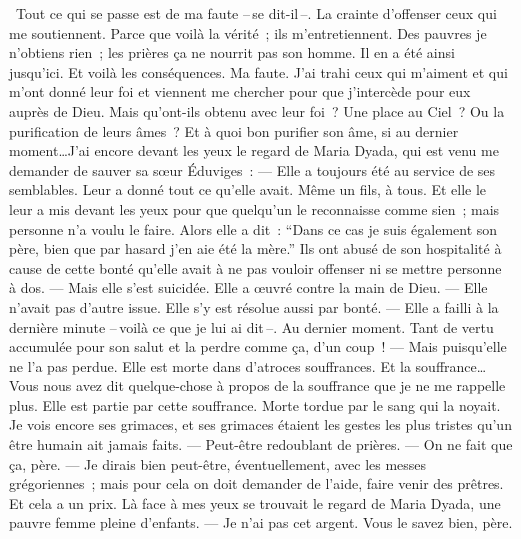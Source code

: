 \begin{pages}
\begin{Rightside}
			\og{} Tout ce qui se passe est de ma faute --\,se dit-il\,--. La crainte d’offenser ceux qui me soutiennent. Parce que voilà la vérité ; ils m’entretiennent. Des pauvres je n’obtiens rien ; les prières ça ne nourrit pas son homme. Il en a été ainsi jusqu’ici. Et voilà les conséquences. Ma faute. J’ai trahi ceux qui m’aiment et qui m’ont donné leur foi et viennent me chercher pour que j’intercède pour eux auprès de Dieu. Mais qu’ont-ils obtenu avec leur foi ? Une place au Ciel ? Ou la purification de leurs âmes ? Et à quoi bon purifier son âme, si au dernier moment\ldots J’ai encore devant les yeux le regard de Maria Dyada, qui est venu me demander de sauver sa sœur Éduviges :
		\pend
		\pstart
			\guillemotright --- Elle a toujours été au service de ses semblables. Leur a donné tout ce qu’elle avait. Même un fils, à tous. Et elle le leur a mis devant les yeux pour que quelqu’un le reconnaisse comme sien ; mais personne n’a voulu le faire. Alors elle a dit : ``Dans ce cas je suis également son père, bien que par hasard j’en aie été la mère.'' Ils ont abusé de son hospitalité à cause de cette bonté qu’elle avait à ne pas vouloir offenser ni se mettre personne à dos.
		\pend
		\pstart
			\guillemotright --- Mais elle s’est suicidée. Elle a œuvré contre la main de Dieu.
		\pend
		\pstart
			\guillemotright --- Elle n’avait pas d’autre issue. Elle s’y est résolue aussi par bonté.
		\pend
		\pstart
			\guillemotright --- Elle a failli à la dernière minute --\,voilà ce que je lui ai dit\,--. Au dernier moment. Tant de vertu accumulée pour son salut et la perdre comme ça, d'un coup !
		\pend
		\pstart
			\guillemotright --- Mais puisqu’elle ne l’a pas perdue. Elle est morte dans d’atroces souffrances. Et la souffrance… Vous nous avez dit quelque-chose à propos de la souffrance que je ne me rappelle plus. Elle est partie par cette souffrance. Morte tordue par le sang qui la noyait. Je vois encore ses grimaces, et ses grimaces étaient les gestes les plus tristes qu’un être humain ait jamais faits.
		\pend
		\pstart
			\guillemotright --- Peut-être redoublant de prières.
		\pend
		\pstart
			\guillemotright --- On ne fait que ça, père.
		\pend
		\pstart
			\guillemotright --- Je dirais bien peut-être, éventuellement, avec les messes grégoriennes ; mais pour cela on doit demander de l’aide, faire venir des prêtres. Et cela a un prix.
		\pend
		\pstart
			\guillemotright Là face à mes yeux se trouvait le regard de Maria Dyada, une pauvre femme pleine d’enfants.
		\pend
		\pstart
			\guillemotright --- Je n’ai pas cet argent. Vous le savez bien, père.
		\pend
		\pstart

\end{Rightside}
\end{pages}
